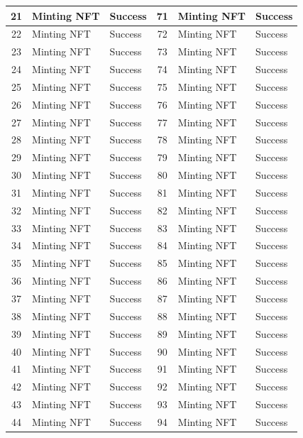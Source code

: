 \begin{longtable}[c]{|c|l|l||c|l|l|}
    21 & Minting NFT & Success & 71 & Minting NFT & Success \\ \hline
    22 & Minting NFT & Success & 72 & Minting NFT & Success \\ \hline
    23 & Minting NFT & Success & 73 & Minting NFT & Success \\ \hline
    24 & Minting NFT & Success & 74 & Minting NFT & Success \\ \hline
    25 & Minting NFT & Success & 75 & Minting NFT & Success \\ \hline
    26 & Minting NFT & Success & 76 & Minting NFT & Success \\ \hline
    27 & Minting NFT & Success & 77 & Minting NFT & Success \\ \hline
    28 & Minting NFT & Success & 78 & Minting NFT & Success \\ \hline
    29 & Minting NFT & Success & 79 & Minting NFT & Success \\ \hline
    30 & Minting NFT & Success & 80 & Minting NFT & Success \\ \hline
    31 & Minting NFT & Success & 81 & Minting NFT & Success \\ \hline
    32 & Minting NFT & Success & 82 & Minting NFT & Success \\ \hline
    33 & Minting NFT & Success & 83 & Minting NFT & Success \\ \hline
    34 & Minting NFT & Success & 84 & Minting NFT & Success \\ \hline
    35 & Minting NFT & Success & 85 & Minting NFT & Success \\ \hline
    36 & Minting NFT & Success & 86 & Minting NFT & Success \\ \hline
    37 & Minting NFT & Success & 87 & Minting NFT & Success \\ \hline
    38 & Minting NFT & Success & 88 & Minting NFT & Success \\ \hline
    39 & Minting NFT & Success & 89 & Minting NFT & Success \\ \hline
    40 & Minting NFT & Success & 90 & Minting NFT & Success \\ \hline
    41 & Minting NFT & Success & 91 & Minting NFT & Success \\ \hline
    42 & Minting NFT & Success & 92 & Minting NFT & Success \\ \hline
    43 & Minting NFT & Success & 93 & Minting NFT & Success \\ \hline
    44 & Minting NFT & Success & 94 & Minting NFT & Success \\ \hline

\end{longtable}
